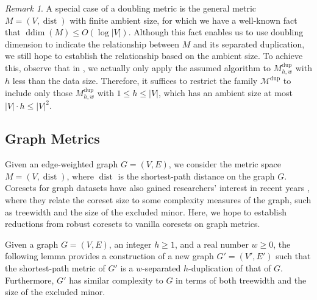 \documentclass[letterpaper,11pt]{article}
\theoremstyle{plain}
\theoremstyle{definition}
\theoremstyle{remark}
\newtheorem{remark}[theorem]{Remark}
\DeclareMathOperator{\ddim}{ddim}
\DeclareMathOperator{\dist}{dist}
\newcommand{\dup}{\mathrm{dup}}
\newcommand{\calM}{\mathcal{M}}
\begin{document}
\begin{appendices}
\begin{remark}
    \label{remark:finite}
    A special case of a doubling metric is the general metric $M=(V,\dist)$ with finite ambient size, for which we have a well-known fact that $\ddim(M)\le O(\log |V|)$. Although this fact enables us to use doubling dimension to indicate the relationship between $M$ and its separated duplication, we still hope to establish the relationship based on the ambient size. To achieve this, observe that in , we actually only apply the assumed algorithm to $M^\dup_{h,w}$ with $h$ less than the data size. 
    Therefore, it suffices to restrict the family $\calM^\dup$ to include only those $M^\dup_{h,w}$ with $1 \leq h \leq |V|$, which has an ambient size at most $|V|\cdot h\leq |V|^2$.
\end{remark}

\subsection{Graph Metrics}

Given an edge-weighted graph $G=(V,E)$, we consider the metric space $M=(V,\dist)$, where $\dist$ is the shortest-path distance on the graph $G$. Coresets for graph datasets have also gained researchers' interest in recent years \cite{DBLP:conf/icml/BakerBHJK020, BJKW21, Cohen-addad2021New,Cohen-AddadD0SS25}, where they relate the coreset size to some complexity measures of the graph, such as treewidth and the size of the excluded minor. Here, we hope to establish reductions from robust coresets to vanilla coresets on graph metrics.

Given a graph $G=(V,E)$, an integer $h\geq 1$, and a real number $w\geq 0$, the following lemma provides a construction of a new graph $G'=(V',E')$ such that the shortest-path metric of $G'$ is a $w$-separated $h$-duplication of that of $G$. Furthermore, $G'$ has similar complexity to $G$ in terms of both treewidth and the size of the excluded minor.


\end{appendices}
\end{document}
